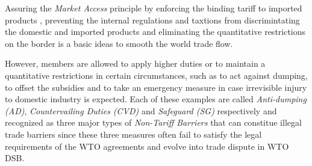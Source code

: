 Assuring the \textit{Market Access} principle 
by enforcing
the binding tariff to imported products
, preventing the internal regulations 
and taxtions from discrimintating the domestic and imported products
and eliminating the quantitative restrictions on the border 
is a basic ideas to smooth the world trade flow. 

However, members are allowed to apply higher duties or to maintain a quantitative restrictions in certain circumstances, such as 
to act against dumping, to offset the subsidies 
and to take an emergency measure in case irrevisible injury to domestic industry is expected. Each of these examples 
are called \textit{Anti-dumping (AD)}, \textit{Countervailing Duties (CVD)} and \textit{Safeguard (SG)} respectively and recognized as 
three major types of \textit{Non-Tariff Barriers} that can constitue illegal trade barriers 
since these three measures often fail to satisfy the legal requirements of the WTO agreements and evolve into trade dispute in WTO DSB.

